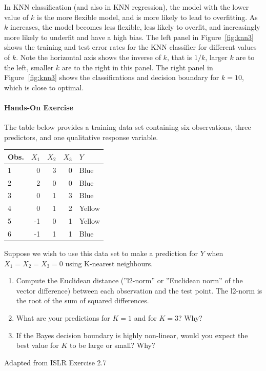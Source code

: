 In KNN classification (and also in KNN regression), the model with the lower value of $k$ is the more flexible model, and is more likely to lead to overfitting. As $k$ increases, the model becomes less flexible, less likely to overfit, and increasingly more likely to underfit and have a high bias. The left panel in Figure~\ref{fig:knn3} shows the training and test error rates for the KNN classifier for different values of $k$. Note the horizontal axis shows the inverse of $k$, that is $1/k$, larger $k$ are to the left, smaller $k$ are to the right in this panel. The right panel in Figure~\ref{fig:knn3} shows the classifications and decision boundary for $k=10$, which is close to optimal.

\begin{tcolorbox}[colback=code]
\paragraph*{Hands-On Exercise} 

The table below provides a training data set containing six observations, three predictors, and one qualitative response variable.\\ 
\vspace{.5\baselineskip}
\begin{center}
\footnotesize
\renewcommand{\arraystretch}{1.1}
\begin{tabular}{l|r|r|r|l} \hline
Obs. & $X_1$ & $X_2$ & $X_3$ & $Y$ \\ \hline
1 & 0 & 3 & 0 & Blue \\
2 & 2 & 0 & 0 & Blue \\
3 & 0 & 1 & 3 & Blue \\
4 & 0 & 1 & 2 & Yellow \\
5 & -1 & 0 & 1 & Yellow \\
6 & -1 & 1 & 1 & Blue \\ \hline
\end{tabular}
\end{center}

\vspace{.5\baselineskip}
Suppose we wish to use this data set to make a prediction for $Y$ when $X_1=X_2=X_3=0$ using K-nearest neighbours.
\vspace{.5\baselineskip}
\begin{enumerate}
  \item Compute the Euclidean distance (''l2-norm'' or ''Euclidean norm'' of the vector difference) between each observation and the test point. The l2-norm is the root of the sum of squared differences.
  \item What are your predictions for $K=1$ and for $K=3$? Why?
  \item If the Bayes decision boundary is highly non-linear, would you expect the best value for $K$ to be large or small? Why?
\end{enumerate}

\vspace{.5\baselineskip}\scriptsize Adapted from ISLR Exercise 2.7
\end{tcolorbox}

